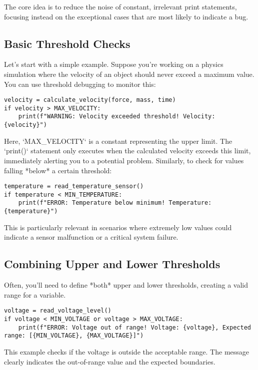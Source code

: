 \documentclass{article}
\begin{document}
{{{The core idea is to reduce the noise of constant, irrelevant print statements, focusing instead on the exceptional cases that are most likely to indicate a bug.

\subsection*{Basic Threshold Checks}

Let's start with a simple example. Suppose you're working on a physics simulation where the velocity of an object should never exceed a maximum value. You can use threshold debugging to monitor this:

\begin{verbatim}
velocity = calculate_velocity(force, mass, time)
if velocity > MAX_VELOCITY:
    print(f"WARNING: Velocity exceeded threshold! Velocity: {velocity}")
\end{verbatim}

Here, `MAX_VELOCITY` is a constant representing the upper limit. The `print()` statement only executes when the calculated velocity exceeds this limit, immediately alerting you to a potential problem. Similarly, to check for values falling *below* a certain threshold:

\begin{verbatim}
temperature = read_temperature_sensor()
if temperature < MIN_TEMPERATURE:
    print(f"ERROR: Temperature below minimum! Temperature: {temperature}")
\end{verbatim}

This is particularly relevant in scenarios where extremely low values could indicate a sensor malfunction or a critical system failure.

\subsection*{Combining Upper and Lower Thresholds}

Often, you'll need to define *both* upper and lower thresholds, creating a valid range for a variable.

\begin{verbatim}
voltage = read_voltage_level()
if voltage < MIN_VOLTAGE or voltage > MAX_VOLTAGE:
    print(f"ERROR: Voltage out of range! Voltage: {voltage}, Expected range: [{MIN_VOLTAGE}, {MAX_VOLTAGE}]")
\end{verbatim}

This example checks if the voltage is outside the acceptable range. The message clearly indicates the out-of-range value and the expected boundaries.

}}}
\end{document}
